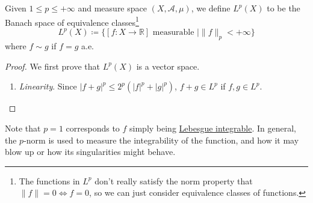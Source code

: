 	\begin{definition}[$L^p$ Space]
    \label{def:lp-space}
		Given $1 \leq p \leq +\infty$ and measure space $(X, \mathcal{A}, \mu)$, we define $L^p (X)$ to be the Banach space of equivalence classes\footnote{The functions in $L^p$ don't really satisfy the norm property that $\|f\| = 0 \iff f =0$, so we can just consider equivalence classes of functions. }
		\begin{equation}
			L^p (X) \coloneqq \big\{ [f: X \to \mathbb{R}] \text{ measurable } \mid \|f\|_p < +\infty \big\}
		\end{equation}
		where $f \sim g$ if $f = g$ a.e.
	\end{definition}
	\begin{proof}
		We first prove that $L^p (X)$ is a vector space. 
		\begin{enumerate}
		  \item \textit{Linearity}. Since $| f + g |^p \leq 2^p (|f|^p + |g|^p)$, $f + g \in L^p$ if $f, g \in L^p$. 
		\end{enumerate}
	\end{proof}

	Note that $p = 1$ corresponds to $f$ simply being \hyperref[mt-def:leb-int-signed]{Lebesgue integrable}. In general, the $p$-norm is used to measure the integrability of the function, and how it may blow up or how its singularities might behave. 

